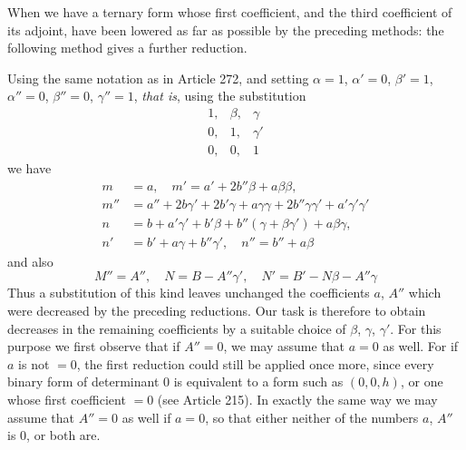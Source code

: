 When we have a ternary form whose first coefficient, and the third coefficient of its adjoint, have been lowered as far as possible by the preceding methods: the following method gives a further reduction.

Using the same notation as in Article 272, and setting \(\alpha=1\), \(\alpha'=0\), \(\beta'=1\), \(\alpha''=0\), \(\beta''=0\), \(\gamma''=1\), \emph{that is}, using the substitution
\[
\begin{array}{ccc}
1,&\beta,&\gamma\\
0,&1,&\gamma'\\
0,&0,&1
\end{array}
\]
we have
\[
\begin{aligned}
m&=a,\quad m'=a'+2b''\beta+a\beta\beta,\\
m''&=a''+2b\gamma'+2b'\gamma+a\gamma\gamma+2b''\gamma\gamma'+a'\gamma'\gamma'\\
n&=b+a'\gamma'+b'\beta+b''(\gamma+\beta\gamma')+a\beta\gamma,\\
n'&=b'+a\gamma+b''\gamma',\quad n''=b''+a\beta
\end{aligned}
\]
and also
\[
M''=A'',\quad N=B-A''\gamma',\quad N'=B'-N\beta-A''\gamma
\]
Thus a substitution of this kind leaves unchanged the coefficients \(a\), \(A''\) which were decreased by the preceding reductions. Our task is therefore to obtain decreases in the remaining coefficients by a suitable choice of \(\beta\), \(\gamma\), \(\gamma'\). For this purpose we first observe that if \(A''=0\), we may assume that \(a=0\) as well. For if \(a\) is not \(=0\), the first reduction could still be applied once more, since every binary form of determinant \(0\) is equivalent to a form such as \((0,0,h)\), or one whose first coefficient \(=0\) (see Article 215). In exactly the same way we may assume that \(A''=0\) as well if \(a=0\), so that either neither of the numbers \(a\), \(A''\) is \(0\), or both are.

